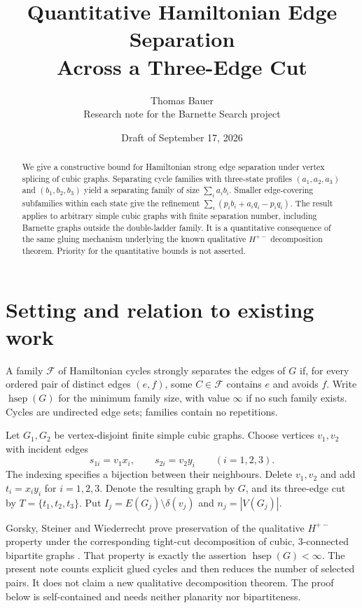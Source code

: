 \documentclass[10pt]{article}
\title{Quantitative Hamiltonian Edge Separation\\Across a Three-Edge Cut}
\author{Thomas Bauer\\\small Research note for the Barnette Search project}
\date{Draft of September 17, 2026}
\newcommand{\hsep}{\operatorname{hsep}}
\begin{document}
\maketitle
\begin{abstract}
We give a constructive bound for Hamiltonian strong edge separation under
vertex splicing of cubic graphs. Separating cycle families with three-state
profiles $(a_1,a_2,a_3)$ and $(b_1,b_2,b_3)$ yield a separating family of size
$\sum_i a_i b_i$. Smaller edge-covering subfamilies within each state give the
refinement $\sum_i(p_i b_i+a_i q_i-p_i q_i)$. The result applies to arbitrary
simple cubic graphs with finite separation number, including Barnette graphs
outside the double-ladder family. It is a quantitative consequence of the
same gluing mechanism underlying the known qualitative $H^{+-}$ decomposition
theorem. Priority for the quantitative bounds is not asserted.
\end{abstract}

\section{Setting and relation to existing work}
A family $\mathcal F$ of Hamiltonian cycles strongly separates the edges of
$G$ if, for every ordered pair of distinct edges $(e,f)$, some $C\in\mathcal F$
contains $e$ and avoids $f$. Write $\hsep(G)$ for the minimum family size,
with value $\infty$ if no such family exists. Cycles are undirected edge sets;
families contain no repetitions.

Let $G_1,G_2$ be vertex-disjoint finite simple cubic graphs. Choose vertices
$v_1,v_2$ with incident edges
\[
 s_{1i}=v_1x_i,\qquad s_{2i}=v_2y_i\qquad (i=1,2,3).
\]
The indexing specifies a bijection between their neighbours. Delete $v_1,v_2$
and add $t_i=x_iy_i$ for $i=1,2,3$. Denote the resulting graph by $G$, and its
three-edge cut by $T=\{t_1,t_2,t_3\}$. Put
$I_j=E(G_j)\setminus\delta(v_j)$ and $n_j=|V(G_j)|$.

Gorsky, Steiner and Wiederrecht prove preservation of the qualitative
$H^{+-}$ property under the corresponding tight-cut decomposition of cubic,
3-connected bipartite graphs \cite[Lemma 4.5(iv) and Theorem 1.7(iv)]{gsw}.
That property is exactly the assertion $\hsep(G)<\infty$. The present note
counts explicit glued cycles and then reduces the number of selected pairs.
It does not claim a new qualitative decomposition theorem. The proof below
is self-contained and needs neither planarity nor bipartiteness.
\end{document}
